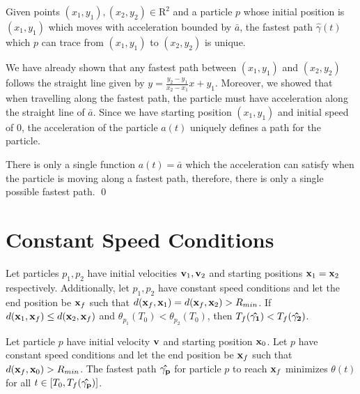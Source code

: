 \begin{corollary}
  Given points $(x_1, y_1), (x_2, y_2) \in \mathrm{R}^2$ and a particle $p$ whose initial position is $(x_1, y_1)$ which moves with acceleration bounded by $\bar{a}$, the fastest path $\hat{\gamma}(t)$ which $p$ can trace from $(x_1, y_1)$ to $(x_2, y_2)$ is unique.
\end{corollary}
\proof We have already shown that any fastest path between $(x_1, y_1)$ and $(x_2, y_2)$ follows the straight line given by $y = \frac{y_2 - y_1}{x_2 - x_1} x + y_1$. Moreover, we showed that when travelling along the fastest path, the particle must have acceleration along the straight line of $\bar{a}$. Since we have starting position $(x_1, y_1)$ and initial speed of $0$, the acceleration of the particle $a(t)$ uniquely defines a path for the particle.

There is only a single function $a(t) = \bar{a}$ which the acceleration can satisfy when the particle is moving along a fastest path, therefore, there is only a single possible fastest path.
\qed



\section{Constant Speed Conditions}

\begin{conjecture}
  Let particles $p_1, p_2$ have initial velocities $\mathbf{v}_1, \mathbf{v}_2$ and starting positions $\mathbf{x}_1 = \mathbf{x}_2$ respectively. Additionally, let $p_1, p_2$ have constant speed conditions and let the end position be $\mathbf{x}_f$ such that $d(\mathbf{x}_f, \mathbf{x}_1) = d(\mathbf{x}_f, \mathbf{x}_2) > R_{min}$. If $d(\mathbf{x}_1, \mathbf{x}_f) \leq d(\mathbf{x}_2, \mathbf{x}_f)$ and $\theta_{p_1}(T_0) < \theta_{p_2}(T_0)$, then $T_f(\mathbf{\hat{\gamma_1}}) < T_f(\mathbf{\hat{\gamma_2}})$.
\end{conjecture}

\begin{theorem}
  Let particle $p$ have initial velocity $\mathbf{v}$ and starting position $\mathbf{x}_0$. Let $p$ have constant speed conditions and let the end position be $\mathbf{x}_f$ such that $d(\mathbf{x}_f, \mathbf{x}_0) > R_{min}$. The fastest path $\mathbf{\hat{\gamma_p}}$ for particle $p$ to reach $\mathbf{x}_f$ minimizes $\theta(t)$ for all $t \in [T_0, T_f(\mathbf{\hat{\gamma_p}})]$.
  \label{theorem:restricted-theta}
\end{theorem}

